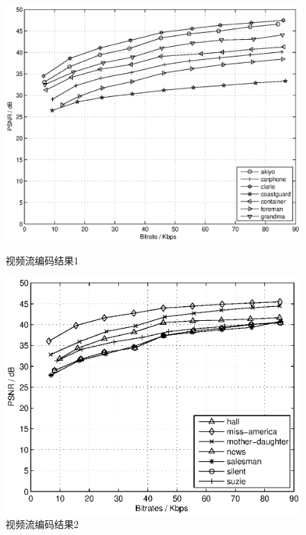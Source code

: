 \begin{figure}[t] 
    \centering 
  \begin{minipage}[t]{0.5\linewidth} 
    \centering 
    \includegraphics[width = \textwidth]{chap_nash_videobitrate_psnr1.eps} 
    \caption{视频流编码结果1} 
    \label{fig:chap_nash:video_psnr1} 
  \end{minipage}%
  \begin{minipage}[t]{0.5\linewidth} 
    \centering 
    \includegraphics[width=\textwidth]{chap_nash_videobitrate_psnr2.eps} 
    \caption{视频流编码结果2} 
    \label{fig:chap_nash:video_psnr2} 
  \end{minipage} 
\end{figure}

